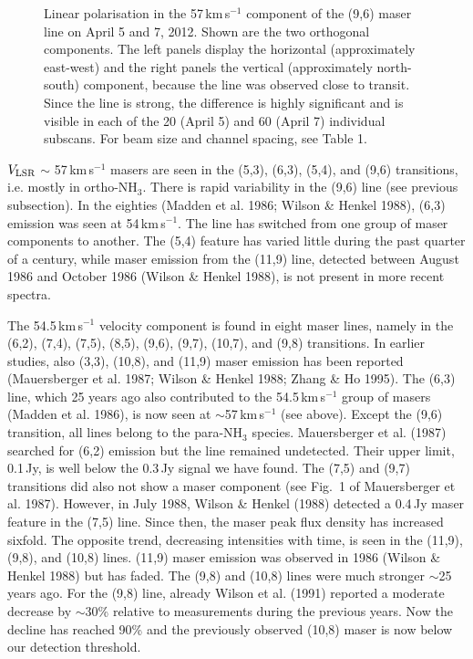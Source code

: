 \documentclass[oldversion]{aa}
\begin{document}
\begin{figure}[t]
\vspace{-4.3cm}
\centering
{}
\vspace{-0.7cm}
\caption{Linear polarisation in the 57\,km\,s$^{-1}$ component
of the (9,6) maser line on April 5 and 7, 2012. Shown are the 
two orthogonal components. The left panels display the horizontal 
(approximately east-west) and the right panels the vertical 
(approximately north-south) component, because the line was observed
close to transit. Since the line is strong, the difference is 
highly significant and is visible in each of the 20 (April 5) 
and 60 (April 7) individual subscans. For beam size and channel
spacing, see Table 1.
\label{fig9}}
\end{figure}


$V_{\rm LSR}$ $\sim$ 57\,km\,s$^{-1}$ masers are seen in the (5,3), 
(6,3), (5,4), and (9,6) transitions, i.e. mostly in 
ortho-NH$_3$. There is rapid variability in the (9,6) line (see 
previous subsection). In the eighties (Madden et al. 1986; 
Wilson \& Henkel 1988), (6,3) emission was seen at 54\,km\,s$^{-1}$. 
The line has switched from one group of maser components
to another. The (5,4) feature has varied little during the past quarter 
of a century, while maser emission from the (11,9) line, detected
between August 1986 and October 1986 (Wilson \& Henkel 1988), is not
present in more recent spectra. 

The 54.5\,km\,s$^{-1}$ velocity component is found in eight maser
lines, namely in the (6,2), (7,4), (7,5), (8,5), (9,6), (9,7), 
(10,7), and (9,8) transitions. In earlier studies, also (3,3), 
(10,8), and (11,9) maser emission has been reported (Mauersberger 
et al. 1987; Wilson \& Henkel 1988; Zhang \& Ho 1995). The (6,3) line, 
which 25 years ago also contributed to the 54.5\,km\,s$^{-1}$ group 
of masers (Madden et al. 1986), is now seen at $\sim$57\,km\,s$^{-1}$
(see above). Except the (9,6) transition, all lines belong to the 
para-NH$_3$ species. Mauersberger et al. (1987) searched for (6,2) 
emission but the line remained undetected. Their upper limit, 
0.1\,Jy, is well below the 0.3\,Jy signal we have found. The 
(7,5) and (9,7) transitions did also not show a maser component 
(see Fig.~1 of Mauersberger et al. 1987). However, in July 1988, 
Wilson \& Henkel (1988) detected a 0.4\,Jy maser feature in the 
(7,5) line. Since then, the maser peak flux density has 
increased sixfold. The opposite trend, decreasing intensities 
with time, is seen in the (11,9), (9,8), and (10,8) lines.  
(11,9) maser emission was observed in 1986 (Wilson \& Henkel 
1988) but has faded. The (9,8) and (10,8) lines were much 
stronger $\sim$25 years ago. For the (9,8) line, already 
Wilson et al.  (1991) reported a moderate decrease by $\sim$30\% 
relative to measurements during the previous years. Now the decline 
has reached 90\% and the previously observed (10,8) maser is
now below our detection threshold.
\end{document}
